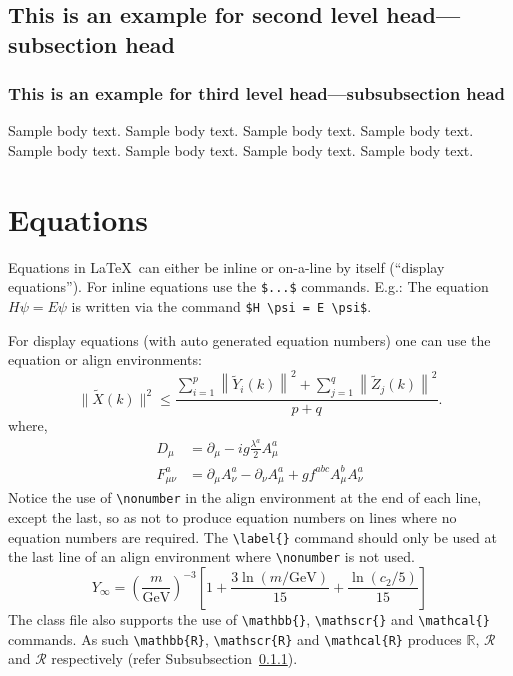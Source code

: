 \documentclass[sn-mathphys-num]{sn-jnl}%
\theoremstyle{thmstyleone}%
\theoremstyle{thmstyletwo}%
\theoremstyle{thmstylethree}%
\begin{document}
\subsection{This is an example for second level head---subsection head}\label{subsec2}

\subsubsection{This is an example for third level head---subsubsection head}\label{subsubsec2}

Sample body text. Sample body text. Sample body text. Sample body text. Sample body text. Sample body text. Sample body text. Sample body text.

\section{Equations}\label{sec4}

Equations in \LaTeX\ can either be inline or on-a-line by itself (``display equations''). For
inline equations use the \verb+$...$+ commands. E.g.: The equation
$H\psi = E \psi$ is written via the command \verb+$H \psi = E \psi$+.

For display equations (with auto generated equation numbers)
one can use the equation or align environments:
\begin{equation}
    \|\tilde{X}(k)\|^2 \leq\frac{\sum\limits_{i=1}^{p}\left\|\tilde{Y}_i(k)\right\|^2+\sum\limits_{j=1}^{q}\left\|\tilde{Z}_j(k)\right\|^2 }{p+q}.\label{eq1}
\end{equation}
where,
\begin{align}
    D_\mu        & =  \partial_\mu - ig \frac{\lambda^a}{2} A^a_\mu \nonumber                            \\
    F^a_{\mu\nu} & = \partial_\mu A^a_\nu - \partial_\nu A^a_\mu + g f^{abc} A^b_\mu A^a_\nu \label{eq2}
\end{align}
Notice the use of \verb+\nonumber+ in the align environment at the end
of each line, except the last, so as not to produce equation numbers on
lines where no equation numbers are required. The \verb+\label{}+ command
should only be used at the last line of an align environment where
\verb+\nonumber+ is not used.
\begin{equation}
    Y_\infty = \left( \frac{m}{\textrm{GeV}} \right)^{-3}
    \left[ 1 + \frac{3 \ln(m/\textrm{GeV})}{15}
        + \frac{\ln(c_2/5)}{15} \right]
\end{equation}
The class file also supports the use of \verb+\mathbb{}+, \verb+\mathscr{}+ and
\verb+\mathcal{}+ commands. As such \verb+\mathbb{R}+, \verb+\mathscr{R}+
and \verb+\mathcal{R}+ produces $\mathbb{R}$, $\mathscr{R}$ and $\mathcal{R}$
respectively (refer Subsubsection~\ref{subsubsec2}).
\end{document}
